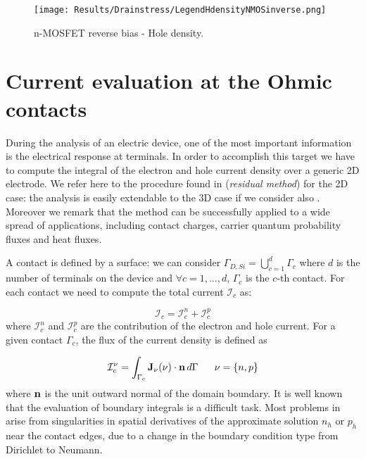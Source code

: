 \begin{figure}[!h]

\hspace{1cm}
\hspace{0.04\textwidth}
{\texttt{[image: Results/Drainstress/LegendHdensityNMOSinverse.png]}}
\caption{n-MOSFET reverse bias - Hole density.}
\label{fig: hole MOS negative}
\end{figure}

\clearpage

\section{Current evaluation at the Ohmic contacts}

During the analysis of an electric device, one of the most important information is the electrical response at terminals. In order to accomplish this target we have to compute the integral of the electron and hole current density over a generic 2D electrode. We refer here to the procedure found in \cite{ContactCurrentRM} (\textit{residual method}) for the 2D case: the analysis is easily extendable to the 3D case if we consider also \cite{GalerkMethConsHughes}. Moreover we remark that the method can be successfully applied to a wide spread of applications, including contact charges, carrier quantum probability fluxes and heat fluxes.

A contact is defined by a surface: we can consider $\Gamma_{D,Si} = \bigcup_{c=1}^d \Gamma_c$ where $d$ is the number of terminals on the device and $\forall c=1,...,d$, $\Gamma_c$ is the $c$-th contact. For each contact we need to compute the total current $\mathcal{I}_c$ as:

\begin{equation}
\mathcal{I}_c = \mathcal{I}_c^n + \mathcal{I}_c^p
\end{equation}
where $\mathcal{I}_c^n$ and $\mathcal{I}_c^p$ are the contribution of the electron and hole current.
For a given contact $\Gamma_c$, the flux of the current density is defined as

\begin{equation}
\label{eq: current flux}
\mathcal{I}_c^\nu = \int_{\Gamma_c}\vect{J}_\nu(\nu) \cdot \vect{n} \, d{\Gamma} \psp{10} \nu = \{n,p\}
\end{equation}
where $\mathbf{n}$ is the unit outward normal of the domain boundary. It is well known that the evaluation of boundary integrals is a difficult task. Most problems in  arise from singularities in spatial derivatives of the approximate solution $n_h$ or $p_h$ near the contact edges, due to a change in the boundary condition type from Dirichlet to Neumann.

